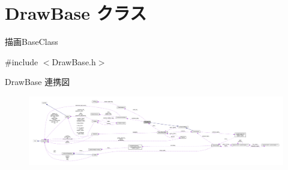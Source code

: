 \hypertarget{class_draw_base}{}\section{Draw\+Base クラス}
\label{class_draw_base}


描画\+Base\+Class  




{\ttfamily \#include $<$Draw\+Base.\+h$>$}



Draw\+Base 連携図\nopagebreak
\begin{figure}[H]
\begin{center}
\leavevmode
\includegraphics[width=350pt]{class_draw_base__coll__graph}
\end{center}
\end{figure}
